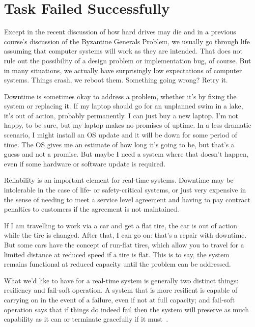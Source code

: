 




\section*{Task Failed Successfully}

Except in the recent discussion of how hard drives may die and in a previous course's discussion of the Byzantine Generals Problem, we usually go through life assuming that computer systems will work as they are intended. That does not rule out the possibility of a design problem or implementation bug, of course. But in many situations, we actually have surprisingly low expectations of computer systems. Things crash, we reboot them. Something going wrong? Retry it.

Downtime is sometimes okay to address a problem, whether it's by fixing the system or replacing it. If my laptop should go for an unplanned swim in a lake, it's out of action, probably permanently. I can just buy a new laptop. I'm not happy, to be sure, but my laptop makes no promises of uptime. In a less dramatic scenario, I might install an OS update and it will be down for some period of time. The OS gives me an estimate of how long it's going to be, but that's a guess and not a promise. But maybe I need a system where that doesn't happen, even if some hardware or software update is required.

Reliability is an important element for real-time systems. Downtime may be intolerable in the case of life- or safety-critical systems, or just very expensive in the sense of needing to meet a service level agreement and having to pay contract penalties to customers if the agreement is not maintained.

If I am travelling to work via a car and get a flat tire, the car is out of action while the tire is changed. After that, I can go on: that's a repair with downtime. But some cars have the concept of run-flat tires, which allow you to travel for a limited distance at reduced speed if a tire is flat. This is to say, the system remains functional at reduced capacity until the problem can be addressed. 

What we'd like to have for a real-time system is generally two distinct things: resiliency and fail-soft operation. A system that is more resilient is capable of carrying on in the event of a failure, even if not at full capacity; and fail-soft operation says that if things do indeed fail then the system will preserve as much capability as it can or terminate gracefully if it must~\cite{osi}. 

